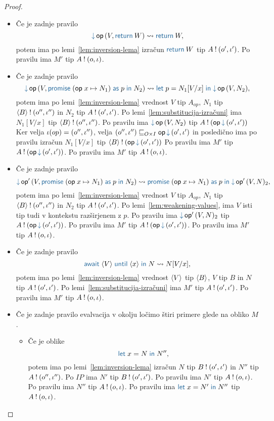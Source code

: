 \begin{proof}
\begin{itemize}
		\item Če je zadnje pravilo $$\tmopin{op}{V}{\tmreturn W} \reduces \tmreturn W,$$ potem ima po lemi~\ref{lem:inversion-lema} izračun $\tmreturn{W}$ tip $A \mathbin{!} (o', \iota')$.
		Po pravilu  ima $M'$ tip $A \mathbin{!} (o, \iota)$.
		
		\item Če je zadnje pravilo $$\tmopin{op}{V}{\tmwith{op}{x}{N_1}{p}{N_2}} \reduces \tmlet{p}{N_1[V/x]}{\tmopin{op}{V}{N_2}},$$ potem ima po lemi~\ref{lem:inversion-lema} vrednost $V$ tip $A_{op}$, $N_1$ tip $\langle B \rangle \mathbin{!} (o'', \iota'')$ in $N_2$ tip $A \mathbin{!} (o', \iota')$.
		Po lemi~\ref{lem:substitucija-izračuni} ima $N_1[V/x]$ tip $\langle B \rangle \mathbin{!} (o'', \iota'')$.
		Po pravilu  ima $\tmopin{op}{V}{N_2}$ tip $\tycomp{A}{\opincomp{op}{(\o', \i')}}$
		Ker velja $\iota(op) = (o'', \iota'')$, velja $(\o'', \i'') \order{O \times I} \opincomp{op}{(\o', \i')}$ in posledično ima po pravilu  izračun $N_1[V/x]$ tip $\tycomp{\typromise{B}}{\opincomp{op}{(\o', \i')}}$
		Po pravilu  ima $M'$ tip $\tycomp{A}{\opincomp{op}{(\o', \i')}}$.
		Po pravilu  ima $M'$ tip $A \mathbin{!} (o, \iota)$.
		
		\item Če je zadnje pravilo $$\tmopin{op'}{V}{\tmwith{op}{x}{N_1}{p}{N_2}} \reduces \tmwith{op}{x}{N_1}{p}{\tmopin{op'}{V}{N}_2},$$ potem ima po lemi~\ref{lem:inversion-lema} vrednost $V$ tip $A_{op}$, $N_1$ tip $\langle B \rangle \mathbin{!} (o'', \iota'')$ in $N_2$ tip $A \mathbin{!} (o', \iota')$.
		Po lemi~\ref{lem:weakening-values}, ima $V$ isti tip tudi v kontekstu razširjenem z $p$.
		Po pravilu  ima $\tmopin{op'}{V}{N}_2$ tip $\tycomp{A}{\opincomp{op}{(\o', \i')}}$.
		Po pravilu  ima $M'$ tip $\tycomp{A}{\opincomp{op}{(\o', \i')}}$.
		Po pravilu  ima $M'$ tip $A \mathbin{!} (o, \iota)$.
		
		\item Če je zadnje pravilo $$\tmawait{\tmpromise V}{x}{N} \reduces N[V/x],$$ potem ima po lemi~\ref{lem:inversion-lema} vrednost $\langle V \rangle$ tip $\langle B \rangle$, $V$ tip $B$ in $N$ tip $A \mathbin{!} (o', \iota')$.
		Po lemi~\ref{lem:substitucija-izračuni} ima $M'$ tip $A \mathbin{!} (o', \iota')$.
		Po pravilu  ima $M'$ tip $A \mathbin{!} (o, \iota)$.
		
		\item Če je zadnje pravilo evalvacija v okolju ločimo štiri primere glede na obliko $M$.
		\begin{itemize}
			\item Če je oblike $$\tmlet{x}{N}{N''},$$ potem ima po lemi~\ref{lem:inversion-lema} izračun $N$ tip $B \mathbin{!} (o', \iota')$ in $N''$ tip $A \mathbin{!} (o'', \iota'')$.
			Po $IP$ ima $N'$ tip $B \mathbin{!} (o', \iota')$.
			Po pravilu  ima $N'$ tip $A \mathbin{!} (o, \iota)$.
			Po pravilu  ima $N''$ tip $A \mathbin{!} (o, \iota)$.
			Po pravilu  ima $\tmlet{x}{N'}{N''}$ tip $A \mathbin{!} (o, \iota)$.
			

\end{itemize}
\end{itemize}
\end{proof}
